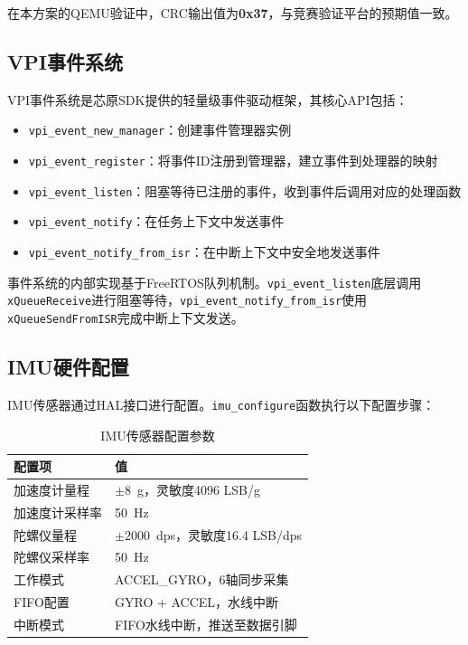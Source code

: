 \documentclass[lettersize,journal]{IEEEtran}
\begin{document}
在本方案的QEMU验证中，CRC输出值为\textbf{0x37}，与竞赛验证平台的预期值一致。

\subsection{VPI事件系统}

VPI事件系统是芯原SDK提供的轻量级事件驱动框架，其核心API包括：

\begin{itemize}[leftmargin=*]
    \item \texttt{vpi\_event\_new\_manager}：创建事件管理器实例
    \item \texttt{vpi\_event\_register}：将事件ID注册到管理器，建立事件到处理器的映射
    \item \texttt{vpi\_event\_listen}：阻塞等待已注册的事件，收到事件后调用对应的处理函数
    \item \texttt{vpi\_event\_notify}：在任务上下文中发送事件
    \item \texttt{vpi\_event\_notify\_from\_isr}：在中断上下文中安全地发送事件
\end{itemize}

事件系统的内部实现基于FreeRTOS队列机制。\texttt{vpi\_event\_listen}底层调用\texttt{xQueueReceive}进行阻塞等待，\texttt{vpi\_event\_notify\_from\_isr}使用\texttt{xQueueSendFromISR}完成中断上下文发送。

\subsection{IMU硬件配置}

IMU传感器通过HAL接口进行配置。\texttt{imu\_configure}函数执行以下配置步骤：

\begin{table}[htbp]
    \centering
    \caption{IMU传感器配置参数}
    \label{tab:imu_config}
    \begin{tabular}{ll}
        \toprule
        \textbf{配置项} & \textbf{值} \\
        \midrule
        加速度计量程       & $\pm 8$~g，灵敏度4096 LSB/g \\
        加速度计采样率     & 50~Hz \\
        陀螺仪量程         & $\pm 2000$~dps，灵敏度16.4 LSB/dps \\
        陀螺仪采样率       & 50~Hz \\
        工作模式           & ACCEL\_GYRO，6轴同步采集 \\
        FIFO配置          & GYRO + ACCEL，水线中断 \\
        中断模式           & FIFO水线中断，推送至数据引脚 \\
        \bottomrule
    \end{tabular}
\end{table}
\end{document}
